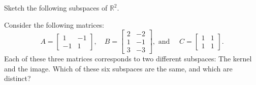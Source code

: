 \documentclass[addpoints]{exam}
\newcommand{\R}{\mathbb{R}}
\begin{document}
\begin{questions}

\question Sketch the following subspaces of $\R^2$.

\question[10] Consider the following matrices:
\[A = \begin{bmatrix} 1 & -1 \\ -1 & 1 \end{bmatrix}, \quad
B = \begin{bmatrix} 2 & -2 \\ 1 & -1 \\ 3 & -3 \end{bmatrix},\text{ and }\quad
C = \begin{bmatrix} 1 & 1 \\ 1 & 1 \end{bmatrix}.\]
Each of these three matrices corresponds to two different subspaces: The kernel and the image. Which of these six subspaces are the same, and which are distinct?


\end{questions}
\end{document}
